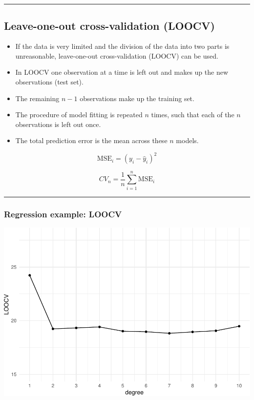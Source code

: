 \documentclass[]{article}
\providecommand{\tightlist}{%
  \setlength{\itemsep}{0pt}\setlength{\parskip}{0pt}}
\begin{document}
\begin{center}\rule{0.5\linewidth}{\linethickness}\end{center}

\hypertarget{leave-one-out-cross-validation-loocv}{%
\subsection{Leave-one-out cross-validation
(LOOCV)}\label{leave-one-out-cross-validation-loocv}}

\begin{itemize}
\tightlist
\item
  If the data is very limited and the division of the data into two
  parts is unreasonable, leave-one-out cross-validation (LOOCV) can be
  used.
\item
  In LOOCV one observation at a time is left out and makes up the new
  observations (test set).
\item
  The remaining \(n-1\) observations make up the training set.
\item
  The procedure of model fitting is repeated \(n\) times, such that each
  of the \(n\) observations is left out once.
\item
  The total prediction error is the mean across these \(n\) models.
\end{itemize}

\[\text{MSE}_i=(y_i-\hat{y}_i)^2\]

\[CV_{n}=\frac{1}{n}\sum_{i=1}^n \text{MSE}_i\]

\begin{center}\rule{0.5\linewidth}{\linethickness}\end{center}

\hypertarget{regression-example-loocv}{%
\subsubsection{Regression example:
LOOCV}\label{regression-example-loocv}}

\includegraphics{5Resample_files/figure-latex/unnamed-chunk-3-1.pdf}
\end{document}

